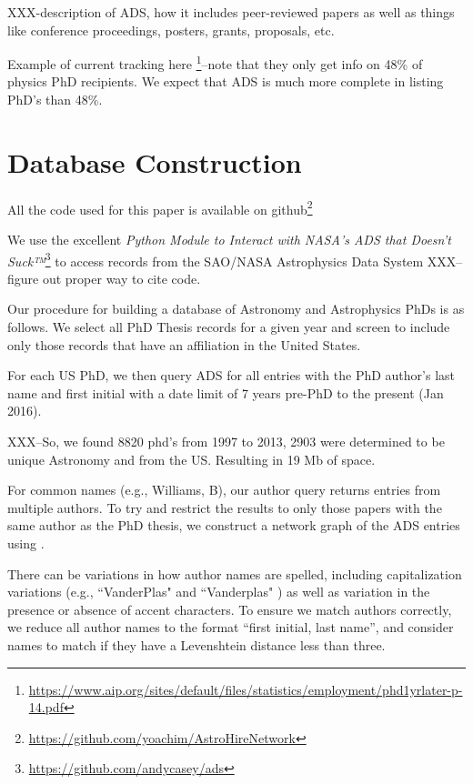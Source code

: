 \documentclass[preprint2]{aastex}
\begin{document}
XXX-description of ADS, how it includes peer-reviewed papers as well as things like conference proceedings, posters, grants, proposals, etc.

Example of current tracking here \footnote{\url{https://www.aip.org/sites/default/files/statistics/employment/phd1yrlater-p-14.pdf}}--note that they only get info on 48\% of physics PhD recipients.  We expect that ADS is much more complete in listing PhD's than 48\%.



\section{Database Construction}\label{sec:db_construct}

All the code used for this paper is available on github\footnote{\url{https://github.com/yoachim/AstroHireNetwork}}

We use the excellent {\emph{Python Module to Interact with NASA's ADS that Doesn't Suck™}}\footnote{\url{https://github.com/andycasey/ads}} to access records from the SAO/NASA Astrophysics Data System XXX--figure out proper way to cite code. 

Our procedure for building a database of Astronomy and Astrophysics PhDs is as follows.  We select all PhD Thesis records for a given year and screen to include only those records that have an affiliation in the United States.

For each US PhD, we then query ADS for all entries with the PhD author's last name and first initial with a date limit of 7 years pre-PhD to the present (Jan 2016).

XXX--So, we found 8820 phd's from 1997 to 2013, 2903 were determined to be unique Astronomy and from the US. Resulting in 19 Mb of space.  

For common names (e.g.,  Williams, B), our author query returns entries from multiple authors.  To try and restrict the results to only those papers with the same author as the PhD thesis, we construct a network graph of the ADS entries using \citet{networkx}.

There can be variations in how author names are spelled, including capitalization variations (e.g., ``VanderPlas" \citep{VanderPlas12} and ``Vanderplas" \citep{van12}) as well as variation in the presence or absence of accent characters.  To ensure we match authors correctly, we reduce all author names to the format ``first initial, last name'', and consider names to match if they have a Levenshtein distance less than three.
\end{document}
